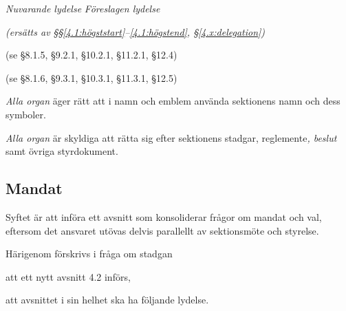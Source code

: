\documentclass{article}
\newenvironment{lydelse}
    {\begin{paracol}{2}%
        \emph{Nuvarande lydelse}%
        \switchcolumn%
        \emph{Föreslagen lydelse}%
    \end{paracol}%
    \begin{enumerate}[label=\thesubsection.\arabic*]%
    \begin{paracol}{2}%
    }{\end{paracol}\end{enumerate}}
\begin{document}
\begin{lydelse}
	\switchcolumn
	  \emph{(ersätts av \S\S \ref{4.1:högststart}--\ref{4.1:högstend}, \S\ref{4.x:delegation})}
    
	\switchcolumn*
    \item[] (se \S 8.1.5, \S 9.2.1, \S 10.2.1, \S 11.2.1, \S 12.4)

    \item[] (se \S 8.1.6, \S 9.3.1, \S 10.3.1, \S 11.3.1, \S 12.5)

  \switchcolumn
    \item \emph{Alla organ} äger rätt att i namn och emblem använda sektionens
      namn och dess symboler.
      \label{4.1:emblem}

    \item \emph{Alla organ} är skyldiga att rätta sig efter sektionens stadgar,
      reglemente\emph{, beslut} samt övriga styrdokument.\label{4.1:rätta}

\end{lydelse}

\subsection{Mandat}
Syftet är att införa ett avsnitt som konsoliderar frågor om mandat och val,
eftersom det ansvaret utövas delvis parallellt av sektionsmöte och styrelse.

Härigenom förskrivs i fråga om stadgan
\begin{dels}
\item att ett nytt avsnitt 4.2 införs,
\item att avsnittet i sin helhet ska ha följande lydelse.
\end{dels}
\end{document}
